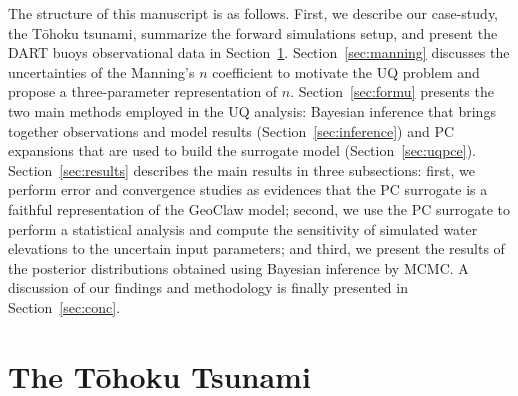 \documentclass[review,12pt]{elsarticle}
\newcommand{\geoclaw}{{\sc GeoClaw}\xspace}
\newcommand{\tohoku}{T\={o}hoku\xspace}
\begin{document}
The structure of this manuscript is as follows. First, we describe our case-study, the \tohoku tsunami,
summarize the forward simulations setup, and present the DART buoys observational data
in Section~\ref{sec:tohoku}. Section~\ref{sec:manning} discusses the uncertainties 
of the Manning's $n$ coefficient to motivate the UQ problem and propose a three-parameter representation of $n$. 
Section~\ref{sec:formu} presents the two main methods employed in the UQ analysis:
Bayesian inference that brings together observations 
and model results (Section~\ref{sec:inference}) 
and PC expansions that are used to build the surrogate model (Section~\ref{sec:uqpce}). Section~\ref{sec:results} describes the main results in 
three subsections: first, we perform error and convergence studies
as evidences that the PC surrogate is a faithful 
representation of the \geoclaw model; second, we use the PC surrogate to 
perform a statistical analysis and compute the  sensitivity of simulated water elevations
to the uncertain input parameters; and third, we present the results of the
posterior distributions obtained using Bayesian inference by MCMC. A discussion of our findings and methodology is finally presented in Section~\ref{sec:conc}.


\section{The \tohoku Tsunami} 
\label{sec:tohoku}
\end{document}
